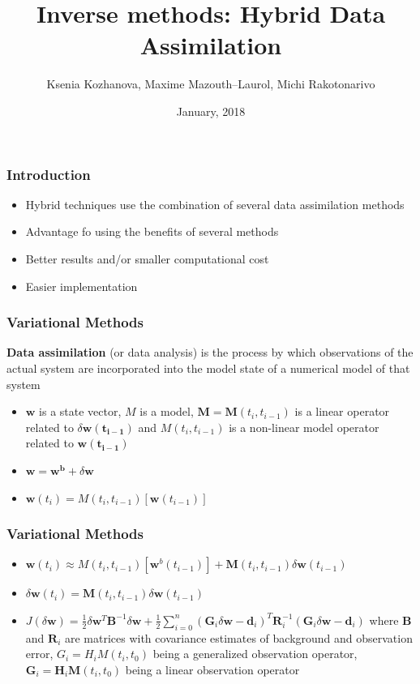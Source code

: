 \documentclass{beamer}
\title[Research articles]{Inverse methods: Hybrid Data Assimilation}
\author{Ksenia Kozhanova, Maxime Mazouth--Laurol, Michi Rakotonarivo}
\institute{Grenoble INP, MSIAM 2}
\date{January, 2018}
\begin{document}
\begin{frame}
\titlepage
\end{frame}


\begin{frame}
	\frametitle{Introduction}
	
	\begin{itemize}
		\item Hybrid techniques use the combination of several data assimilation methods
		\item Advantage fo using the benefits of several methods
		\item Better results and/or smaller computational cost
		\item Easier implementation
	\end{itemize}
\end{frame}

\begin{frame}
\frametitle{Variational Methods}

\begin{definition}
	\textbf{Data assimilation} (or data analysis) is the process by which observations of the actual system are incorporated into the model state of a numerical model of that system
\end{definition}


\begin{itemize}
	\item $\mathbf{w}$ is a state vector, $M$ is a model, $\mathbf {M} = \mathbf {M}(t_{i}, t_{i-1})$ is a linear operator related to $\delta \mathbf {w(t_{i-1})}$ and $M(t_{i},t_{i-1})$ is a non-linear model operator related to $\mathbf {w(t_{i-1})}$
	\item $ \mathbf{w} = \mathbf {w^{b}}+\delta \mathbf {w}$
	\item $\mathbf {w}(t_{i})=M(t_{i},t_{i-1})[\mathbf {w}(t_{i-1})]$
\end{itemize}
\end{frame}


\begin{frame}
	\frametitle{Variational Methods}
	
	\begin{itemize}
		\item $\mathbf {w}(t_{i}) \approx M(t_{i},t_{i-1})[\mathbf {w}^{b}(t_{i-1})] + \mathbf {M}(t_{i},t_{i-1})\delta \mathbf {w}(t_{i-1})$
		\item $\delta \mathbf {w}(t_{i}) = \mathbf {M}(t_{i},t_{i-1})\delta \mathbf {w}(t_{i-1})$
	
		\item $J(\delta \mathbf {w}) = \frac{1}{2} \delta \mathbf {w}^{T} \mathbf {B}^{-1} \delta \mathbf {w} + \frac{1}{2} \sum_{i=0}^{n}(\mathbf {G}_{i} \delta \mathbf {w} - \mathbf {d}_{i})^{T}\mathbf {R}_{i}^{-1}(\mathbf {G}_{i} \delta \mathbf {w} - \mathbf {d}_{i})$
		where $\mathbf {B}$ and $\mathbf {R}_{i}$ are matrices with covariance estimates of background and observation error, $G_{i} = H_{i}M(t_{i},t_{0})$ being a generalized observation operator, $\mathbf {G}_{i} = \mathbf {H}_{i}\mathbf {M}(t_{i},t_{0})$ being a linear observation operator
	\end{itemize}
\end{frame}
\end{document}
